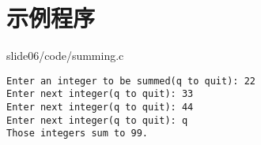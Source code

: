 \section{示例程序}

\begin{frame}[fragile]\ft{\secname}
  
  {slide06/code/summing.c}
\end{frame}



\begin{frame}[fragile]\ft{\secname}
\begin{lstlisting}[backgroundcolor=\color{red!10}]
Enter an integer to be summed(q to quit): 22
Enter next integer(q to quit): 33
Enter next integer(q to quit): 44
Enter next integer(q to quit): q
Those integers sum to 99.
\end{lstlisting}
\end{frame}
